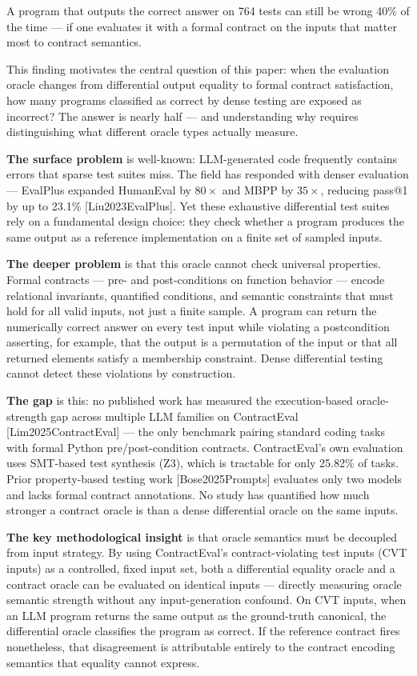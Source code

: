 
A program that outputs the correct answer on 764 tests can still be wrong 40\% of the time --- if one evaluates it with a formal contract on the inputs that matter most to contract semantics.

This finding motivates the central question of this paper: when the evaluation oracle changes from differential output equality to formal contract satisfaction, how many programs classified as correct by dense testing are exposed as incorrect? The answer is nearly half --- and understanding why requires distinguishing what different oracle types actually measure.

\textbf{The surface problem} is well-known: LLM-generated code frequently contains errors that sparse test suites miss. The field has responded with denser evaluation --- EvalPlus expanded HumanEval by $80\times$ and MBPP by $35\times$, reducing pass@1 by up to 23.1\% [Liu2023EvalPlus]. Yet these exhaustive differential test suites rely on a fundamental design choice: they check whether a program produces the same output as a reference implementation on a finite set of sampled inputs.

\textbf{The deeper problem} is that this oracle cannot check universal properties. Formal contracts --- pre- and post-conditions on function behavior --- encode relational invariants, quantified conditions, and semantic constraints that must hold for all valid inputs, not just a finite sample. A program can return the numerically correct answer on every test input while violating a postcondition asserting, for example, that the output is a permutation of the input or that all returned elements satisfy a membership constraint. Dense differential testing cannot detect these violations by construction.

\textbf{The gap} is this: no published work has measured the execution-based oracle-strength gap across multiple LLM families on ContractEval [Lim2025ContractEval] --- the only benchmark pairing standard coding tasks with formal Python pre/post-condition contracts. ContractEval's own evaluation uses SMT-based test synthesis (Z3), which is tractable for only 25.82\% of tasks. Prior property-based testing work [Bose2025Prompts] evaluates only two models and lacks formal contract annotations. No study has quantified how much stronger a contract oracle is than a dense differential oracle on the same inputs.

\textbf{The key methodological insight} is that oracle semantics must be decoupled from input strategy. By using ContractEval's contract-violating test inputs (CVT inputs) as a controlled, fixed input set, both a differential equality oracle and a contract oracle can be evaluated on identical inputs --- directly measuring oracle semantic strength without any input-generation confound. On CVT inputs, when an LLM program returns the same output as the ground-truth canonical, the differential oracle classifies the program as correct. If the reference contract fires nonetheless, that disagreement is attributable entirely to the contract encoding semantics that equality cannot express.

